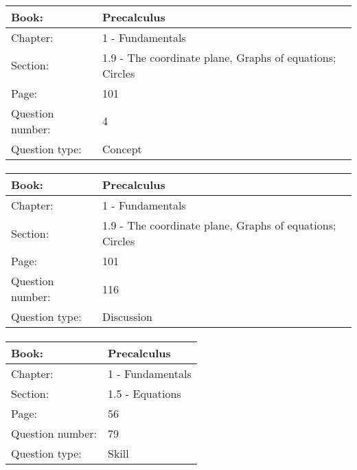 \documentclass{article}
\begin{document}
   \paragraph{}
   \begin{tabularx}{1\textwidth}{
           p{}
           p{}
       }
       \toprule
       Book: & Precalculus
       \\
       \midrule
       Chapter: & 1 - Fundamentals
       \\
       \midrule
       Section: & 1.9 - The coordinate plane, Graphs of equations; Circles
       \\
       \midrule
       Page: & 101
       \\
       \midrule
       Question number: & 4
       \\
       \midrule
       Question type: & Concept
       \\
       \bottomrule
   \end{tabularx}



   \paragraph{}
   \begin{tabularx}{1\textwidth}{
           p{}
           p{}
       }
       \toprule
       Book: & Precalculus
       \\
       \midrule
       Chapter: & 1 - Fundamentals
       \\
       \midrule
       Section: & 1.9 - The coordinate plane, Graphs of equations; Circles
       \\
       \midrule
       Page: & 101
       \\
       \midrule
       Question number: & 116
       \\
       \midrule
       Question type: & Discussion
       \\
       \bottomrule
   \end{tabularx}



   \paragraph{}
   \begin{tabularx}{1\textwidth}{
           p{}
           p{}
       }
       \toprule
       Book: & Precalculus
       \\
       \midrule
       Chapter: & 1 - Fundamentals
       \\
       \midrule
       Section: & 1.5 - Equations
       \\
       \midrule
       Page: & 56
       \\
       \midrule
       Question number: & 79
       \\
       \midrule
       Question type: & Skill
       \\
       \bottomrule
   \end{tabularx}
\end{document}
